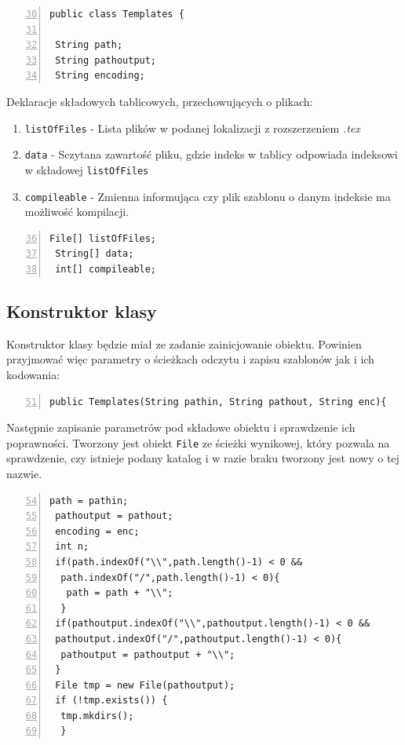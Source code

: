 \begin{lstlisting}[numbers=left,firstnumber=30]
public class Templates {
    
 String path; 
 String pathoutput;
 String encoding;
  \end{lstlisting}
  
Deklaracje składowych tablicowych, przechowujących o plikach:
    \begin{enumerate}
    \item \texttt{listOfFiles} - Lista plików w podanej lokalizacji z rozszerzeniem \emph{.tex}
    \item \texttt{data}  - Sczytana zawartość pliku, gdzie indeks w tablicy odpowiada indeksowi w składowej \texttt{listOfFiles}
    \item \texttt{compileable} - Zmienna informująca czy plik szablonu o danym indeksie ma możliwość kompilacji.
     \end{enumerate}
  
  \begin{lstlisting}[numbers=left,firstnumber=36]
 File[] listOfFiles;
 String[] data;
 int[] compileable;
  \end{lstlisting}
  
\subsection{Konstruktor klasy}

Konstruktor klasy będzie miał ze zadanie zainicjowanie obiektu. Powinien przyjmować więc parametry o ścieżkach odczytu i zapisu szablonów jak i ich kodowania:

  \begin{lstlisting}[numbers=left,firstnumber=51]
 public Templates(String pathin, String pathout, String enc){
  \end{lstlisting}
  
  Następnie zapisanie parametrów pod składowe obiektu i sprawdzenie ich poprawności. Tworzony jest obiekt \texttt{File} ze ścieżki wynikowej, który pozwala na sprawdzenie, czy istnieje podany katalog i w razie braku tworzony jest nowy o tej nazwie.
  
  \begin{lstlisting}[numbers=left,firstnumber=54]
 path = pathin;
 pathoutput = pathout;
 encoding = enc;
 int n;
 if(path.indexOf("\\",path.length()-1) < 0 && 
  path.indexOf("/",path.length()-1) < 0){
   path = path + "\\";
  }
 if(pathoutput.indexOf("\\",pathoutput.length()-1) < 0 &&
 pathoutput.indexOf("/",pathoutput.length()-1) < 0){
  pathoutput = pathoutput + "\\";
 }
 File tmp = new File(pathoutput);
 if (!tmp.exists()) {
  tmp.mkdirs();
  }
    \end{lstlisting}
    
